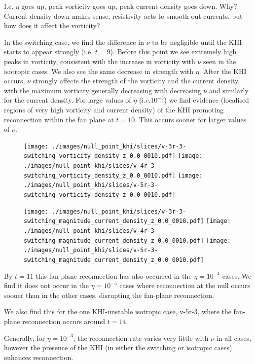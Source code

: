 I.e. $\eta$ goes up, peak vorticity goes up, peak current density goes down. Why? Current density down makes sense, resistivity acts to smooth out currents, but how does it affect the vorticity?

In the switching case, we find the difference in $\nu$ to be negligible until the KHI starts to appear strongly (i.e. $t=9$). Before this point we see extremely high peaks in vorticity, consistent with the increase in vorticity with $\nu$ seen in the isotropic cases. We also see the same decrease in strength with $\eta$. After the KHI occurs, $\nu$ strongly affects the strength of the vorticity and the current density, with the maximum vorticity generally decreasing with decreasing $\nu$ and similarly for the current density. For large values of $\eta$ (i.e.$10^{-3}$) we find evidence (localised regions of very high vorticity and current density) of the KHI promoting reconnection within the fan plane at $t=10$. This occurs sooner for larger values of $\nu$.

\begin{figure}[H]
  \centering
  \texttt{[image: ./images/null\_point\_khi/slices/v-3r-3-switching\_vorticity\_density\_z\_0.0\_0010.pdf]}
  \texttt{[image: ./images/null\_point\_khi/slices/v-4r-3-switching\_vorticity\_density\_z\_0.0\_0010.pdf]}
  \texttt{[image: ./images/null\_point\_khi/slices/v-5r-3-switching\_vorticity\_density\_z\_0.0\_0010.pdf]}
\end{figure}

\begin{figure}[H]
  \centering
  \texttt{[image: ./images/null\_point\_khi/slices/v-3r-3-switching\_magnitude\_current\_density\_z\_0.0\_0010.pdf]}
  \texttt{[image: ./images/null\_point\_khi/slices/v-4r-3-switching\_magnitude\_current\_density\_z\_0.0\_0010.pdf]}
  \texttt{[image: ./images/null\_point\_khi/slices/v-5r-3-switching\_magnitude\_current\_density\_z\_0.0\_0010.pdf]}
\end{figure}

By $t=11$ this fan-plane reconnection has also occurred in the $\eta=10^{-4}$ cases. We find it does not occur in the $\eta=10^{-5}$ cases where reconnection at the null occurs sooner than in the other cases, disrupting the fan-plane reconnection.

We also find this for the one KHI-unstable isotropic case, v-5r-3, where the fan-plane reconnection occurs around $t=14$.

Generally, for $\eta=10^{-3}$, the reconnection rate varies very little with $\nu$ in all cases, however the presence of the KHI (in either the switching or isotropic cases) enhances reconnection.

